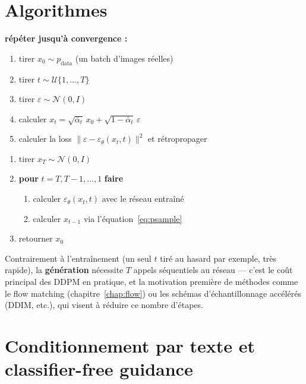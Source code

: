 \section{Algorithmes}

\begin{codebox}[title=Algorithme 1 : Entraînement]
\textbf{répéter jusqu'à convergence :}
\begin{enumerate}[nosep]
    \item tirer $x_0 \sim p_{\text{data}}$ (un batch d'images réelles)
    \item tirer $t \sim \mathcal{U}\{1, \dots, T\}$
    \item tirer $\varepsilon \sim \mathcal{N}(0, I)$
    \item calculer $x_t = \sqrt{\bar\alpha_t}\,x_0 + \sqrt{1-\bar\alpha_t}\,\varepsilon$
    \item calculer la loss $\lVert \varepsilon - \varepsilon_\theta(x_t, t) \rVert^2$ et rétropropager
\end{enumerate}
\end{codebox}

\begin{codebox}[title=Algorithme 2 : Génération (sampling)]
\begin{enumerate}[nosep]
    \item tirer $x_T \sim \mathcal{N}(0, I)$
    \item \textbf{pour} $t = T, T-1, \dots, 1$ \textbf{faire}
    \begin{enumerate}[nosep]
        \item calculer $\varepsilon_\theta(x_t, t)$ avec le réseau entraîné
        \item calculer $x_{t-1}$ via l'équation~\eqref{eq:psample}
    \end{enumerate}
    \item retourner $x_0$
\end{enumerate}
\end{codebox}

\begin{remarque}
Contrairement à l'entraînement (un seul $t$ tiré au hasard par exemple, très rapide), la
\textbf{génération} nécessite $T$ appels séquentiels au réseau — c'est le coût principal des DDPM en
pratique, et la motivation première de méthodes comme le flow matching
(chapitre~\ref{chap:flow}) ou les schémas d'échantillonnage accélérés (DDIM, etc.), qui visent à
réduire ce nombre d'étapes.
\end{remarque}

\section{Conditionnement par texte et classifier-free guidance}
\label{sec:cfg}

